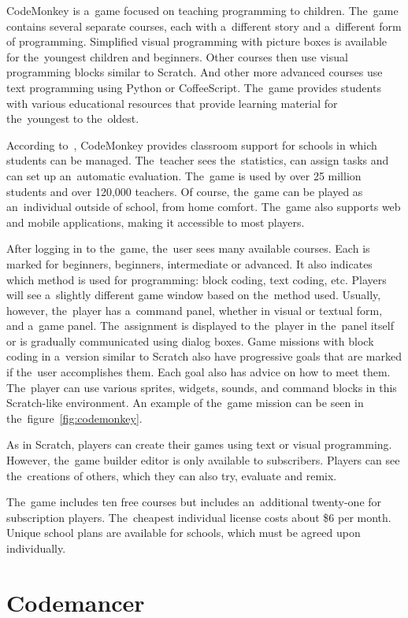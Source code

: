 CodeMonkey is a~game focused on teaching programming to children.
The~game contains several separate courses, each with a~different story and a~different form of programming.
Simplified visual programming with picture boxes is available for the~youngest children and beginners.
Other courses then use visual programming blocks similar to Scratch.
And other more advanced courses use text programming using Python or CoffeeScript.
The~game provides students with various educational resources that provide learning material for the~youngest to the~oldest.

\pagebreak
According to~\cite{a2020_codemonkey}, CodeMonkey provides classroom support for schools in which students can be managed.
The~teacher sees the~statistics, can assign tasks and can set up an~automatic evaluation.
The~game is used by over 25 million students and over 120,000 teachers.
Of course, the~game can be played as an~individual outside of school, from home comfort.
The~game also supports web and mobile applications, making it accessible to most players.

After logging in to the~game, the~user sees many available courses.
Each is marked for beginners, beginners, intermediate or advanced.
It also indicates which method is used for programming: block coding, text coding, etc.
Players will see a~slightly different game window based on the~method used.
Usually, however, the~player has a~command panel, whether in visual or textual form, and a~game panel.
The~assignment is displayed to the~player in the~panel itself or is gradually communicated using dialog boxes.
Game missions with block coding in a~version similar to Scratch also have progressive goals that are marked if the~user accomplishes them.
Each goal also has advice on how to meet them.
The~player can use various sprites, widgets, sounds, and command blocks in this Scratch-like environment.
An example of the~game mission can be seen in the~figure~\ref{fig:codemonkey}.

As in Scratch, players can create their games using text or visual programming.
However, the~game builder editor is only available to subscribers.
Players can see the~creations of others, which they can also try, evaluate and remix.

The~game includes ten free courses but includes an~additional twenty-one for subscription players.
The~cheapest individual license costs about \$6 per month.
Unique school plans are available for schools, which must be agreed upon individually.

\section{Codemancer}

